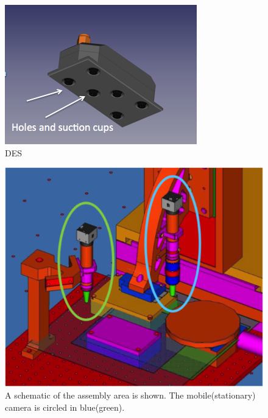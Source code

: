 \documentclass[fleqn,10pt]{SelfArx} %
\begin{document}
\begin{figure}[ht]\centering %
\includegraphics[width=\linewidth]{pickuptool.png}
\caption{DES}
\label{fig:pickuptool}
\end{figure}


\begin{figure}[ht]\centering %
\includegraphics[width=\linewidth]{CADSetup.png}
\caption{A schematic of the assembly area is shown. The mobile(stationary) camera is circled in blue(green).}
\label{fig:cadsetup}
\end{figure}
\end{document}

